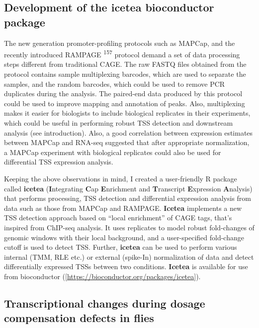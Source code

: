 \documentclass[11pt,twoside]{MPIthesis}
\theoremstyle{definition}
\theoremstyle{definition}
\theoremstyle{definition}
\theoremstyle{remark}
\begin{document}
\subsection{Development of the icetea bioconductor
package}\label{development-of-the-icetea-bioconductor-package}

The new generation promoter-profiling protocols such as MAPCap, and the
recently introduced RAMPAGE \textsuperscript{157} protocol demand a set
of data processing steps different from traditional CAGE. The raw FASTQ
files obtained from the protocol contains sample multiplexing barcodes,
which are used to separate the samples, and the random barcodes, which
could be used to remove PCR duplicates during the analysis. The
paired-end data produced by this protocol could be used to improve
mapping and annotation of peaks. Also, multiplexing makes it easier for
biologists to include biological replicates in their experiments, which
could be useful in performing robust TSS detection and downstream
analysis (see introduction). Also, a good correlation between expression
estimates between MAPCap and RNA-seq suggested that after appropriate
normalization, a MAPCap experiment with biological replicates could also
be used for differential TSS expression analysis.

Keeping the above observations in mind, I created a user-friendly R
package called \textbf{icetea} (\textbf{I}ntegrating \textbf{C}ap
\textbf{E}nrichment and \textbf{T}ranscript \textbf{E}xpression
\textbf{A}nalysis) that performs processing, TSS detection and
differential expression analysis from data such as those from MAPCap and
RAMPAGE. \textbf{Icetea} implements a new TSS detection approach based
on ``local enrichment'' of CAGE tags, that's inspired from ChIP-seq
analysis. It uses replicates to model robust fold-changes of genomic
windows with their local background, and a user-specified fold-change
cutoff is used to detect TSS. Further, \textbf{icetea} can be used to
perform various internal (TMM, RLE etc.) or external (spike-In)
normalization of data and detect differentially expressed TSSs between
two conditions. \textbf{Icetea} is available for use from bioconductor
({[}{\url{https://bioconductor.org/packages/icetea}}{]}).

\subsection{Transcriptional changes during dosage compensation defects
in
flies}\label{transcriptional-changes-during-dosage-compensation-defects-in-flies}
\end{document}
